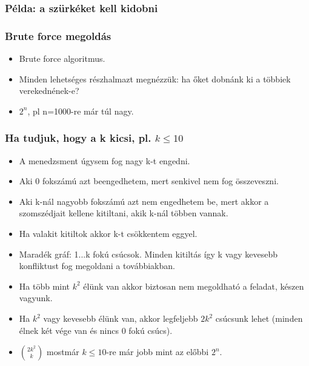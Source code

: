 \documentclass[aspectratio=169]{beamer}
\begin{document}
\begin{frame}
\frametitle{Példa: a szürkéket kell kidobni}
\begin{center}
\end{center}

\end{frame}

\begin{frame}
\frametitle{Brute force megoldás}
\begin{itemize}
\item Brute force algoritmus.
\item Minden lehetséges részhalmazt megnézzük: ha őket dobnánk ki a többiek verekednének-e?
\item $2^n$, pl n=1000-re már túl nagy.
\end{itemize}
\end{frame}

\begin{frame}
\frametitle{Ha tudjuk, hogy a k kicsi, pl. $k\leq{}10$}
\begin{itemize}
\item A menedzsment úgysem fog nagy k-t engedni.
\item Aki 0 fokszámú azt beengedhetem, mert senkivel nem fog összeveszni.
\item Aki k-nál nagyobb fokszámú azt nem engedhetem be, mert akkor a szomszédjait kellene kitiltani, akik k-nál többen vannak.
\item Ha valakit kitiltok akkor k-t csökkentem eggyel.
\item Maradék gráf: 1...k fokú csúcsok. Minden kitiltás így k vagy kevesebb konfliktust fog megoldani a továbbiakban.
\item Ha több mint $k^2$ élünk van akkor biztosan nem megoldható a feladat, készen vagyunk.
\item Ha $k^2$ vagy kevesebb élünk van, akkor legfeljebb $2k^2$ csúcsunk lehet (minden élnek két vége van és nincs 0 fokú csúcs).
\item ${2k^2 \choose k}$ mostmár $k\leq{}10$-re már jobb mint az előbbi $2^n$.
\end{itemize}
\end{frame}
\end{document}
